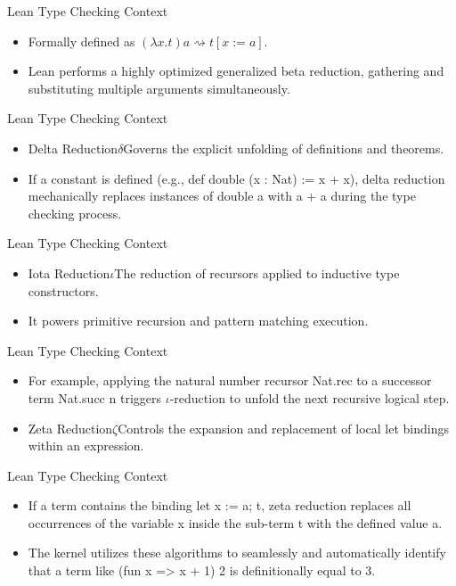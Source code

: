 \documentclass[10pt]{beamer}
\begin{document}
\begin{frame}{Lean Type Checking Context}
\begin{itemize}\setlength{\itemsep}{1.5em}
  \item Formally defined as $(\lambda x. t) a \rightsquigarrow t[x := a]$.
  \item Lean performs a highly optimized generalized beta reduction, gathering and substituting multiple arguments simultaneously.
\end{itemize}
\end{frame}

\begin{frame}{Lean Type Checking Context}
\begin{itemize}\setlength{\itemsep}{1.5em}
  \item Delta Reduction$\delta$Governs the explicit unfolding of definitions and theorems.
  \item If a constant is defined (e.g., def double (x : Nat) := x + x), delta reduction mechanically replaces instances of double a with a + a during the type checking process.
\end{itemize}
\end{frame}

\begin{frame}{Lean Type Checking Context}
\begin{itemize}\setlength{\itemsep}{1.5em}
  \item Iota Reduction$\iota$The reduction of recursors applied to inductive type constructors.
  \item It powers primitive recursion and pattern matching execution.
\end{itemize}
\end{frame}

\begin{frame}{Lean Type Checking Context}
\begin{itemize}\setlength{\itemsep}{1.5em}
  \item For example, applying the natural number recursor Nat.rec to a successor term Nat.succ n triggers $\iota$-reduction to unfold the next recursive logical step.
  \item Zeta Reduction$\zeta$Controls the expansion and replacement of local let bindings within an expression.
\end{itemize}
\end{frame}

\begin{frame}{Lean Type Checking Context}
\begin{itemize}\setlength{\itemsep}{1.5em}
  \item If a term contains the binding let x := a; t, zeta reduction replaces all occurrences of the variable x inside the sub-term t with the defined value a.
  \item The kernel utilizes these algorithms to seamlessly and automatically identify that a term like (fun x => x + 1) 2 is definitionally equal to 3.
\end{itemize}
\end{frame}
\end{document}
